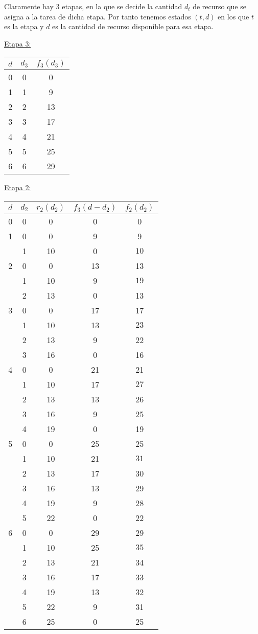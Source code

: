 \documentclass[MIOP.tex]{subfiles}
\begin{document}
\begin{solucion}
Claramente hay 3 etapas, en la que se decide la cantidad $d_t$ de recurso que se asigna a la tarea de dicha etapa. Por tanto tenemos estados $(t,d)$ en los que $t$ es la etapa y $d$ es la cantidad de recurso disponible para esa etapa.

\underline{Etapa 3:}
\begin{center}
\begin{tabular}{|c|c|c|}
\hline
$d$ & $d_3$ & $f_3(d_3)$\\
\hline
0 & 0 & 0\\
1 & 1 & 9\\
2 & 2 & 13\\
3 & 3 & 17\\
4 & 4 & 21\\
5 & 5 & 25\\
6 & 6 & 29\\
\hline
\end{tabular}
\end{center}

\underline{Etapa 2:}
\begin{center}
\begin{tabular}{|c|c|c|c|c|}
\hline
$d$ & $d_2$ & $r_2(d_2)$ & $f_3(d-d_2)$ & $f_2(d_2)$\\
\hline
0 & 0 & 0 & 0 & 0\\
\hline
\hline
1 & 0 & 0 & 9 & 9\\
 & 1 & 10 & 0 & $\boxed{10}$  \\
\hline
\hline
2 & 0 & 0 & 13 & 13 \\
 & 1 & 10 & 9 & $\boxed{19}$\\
 & 2 & 13 & 0 & 13\\
\hline
\hline
3 & 0 & 0 & 17 & 17\\
  & 1 & 10 & 13 & $\boxed{23}$\\
  & 2 & 13 & 9 & 22\\
  & 3 & 16 & 0 & 16\\
\hline
\hline
4 & 0 & 0 & 21 & 21\\
  & 1 & 10 & 17 & $\boxed{27}$\\
  & 2 & 13 & 13& 26\\
  & 3 & 16 & 9 & 25\\
  & 4 & 19 & 0 & 19\\
\hline
\hline
5 & 0 & 0 & 25 & 25\\
  & 1 & 10 & 21 & $\boxed{31}$\\
  & 2 & 13 & 17 & 30\\
  & 3 & 16 & 13 & 29\\
  & 4 & 19 & 9 & 28\\
  & 5 & 22 & 0 & 22\\
\hline
\hline
6 & 0 & 0 & 29 & 29\\
  & 1 & 10 & 25 & $\boxed{35}$\\
  & 2 & 13 & 21 & 34\\
  & 3 & 16 & 17 & 33\\
  & 4 & 19 & 13 & 32\\
  & 5 & 22 & 9 & 31\\
  & 6 & 25 & 0 & 25\\
\hline
\end{tabular}
\end{center}


\end{solucion}
\end{document}
